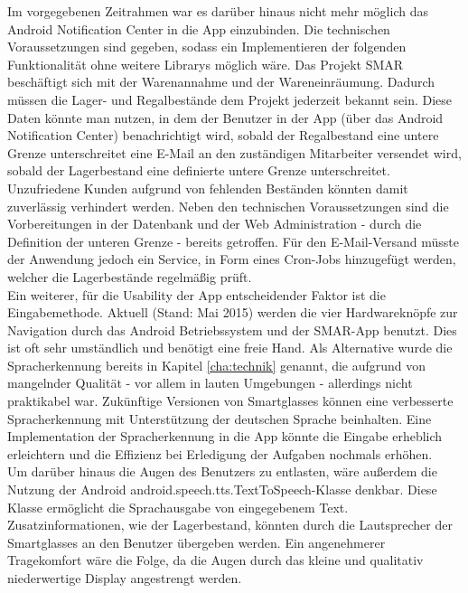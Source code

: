 Im vorgegebenen Zeitrahmen war es darüber hinaus nicht mehr möglich das Android Notification Center in die App einzubinden. Die technischen Voraussetzungen sind gegeben, sodass ein Implementieren der folgenden Funktionalität ohne weitere Librarys möglich wäre. Das Projekt \ac{SMAR} beschäftigt sich mit der Warenannahme und der Wareneinräumung. Dadurch müssen die Lager- und Regalbestände dem Projekt jederzeit bekannt sein. Diese Daten könnte man nutzen, in dem der Benutzer in der App (\zB über das Android Notification Center) benachrichtigt wird, sobald der Regalbestand eine untere Grenze unterschreitet \bzw eine E-Mail an den zuständigen Mitarbeiter versendet wird, sobald der Lagerbestand eine definierte untere Grenze unterschreitet. Unzufriedene Kunden aufgrund von fehlenden Beständen könnten damit zuverlässig verhindert werden. Neben den technischen Voraussetzungen sind die Vorbereitungen in der Datenbank und der Web Administration - durch die Definition der unteren Grenze - bereits getroffen. Für den E-Mail-Versand müsste der Anwendung jedoch ein Service, \zB in Form eines Cron-Jobs hinzugefügt werden, welcher die Lagerbestände regelmäßig prüft.\\

Ein weiterer, für die Usability der App entscheidender Faktor ist die Eingabemethode. Aktuell (Stand: Mai 2015) werden die vier Hardwareknöpfe zur Navigation durch das Android Betriebssystem und der \ac{SMAR}-App benutzt. Dies ist oft sehr umständlich und benötigt eine freie Hand. Als Alternative wurde die Spracherkennung bereits in Kapitel \ref{cha:technik}  genannt, die aufgrund von mangelnder Qualität - vor allem in lauten Umgebungen - allerdings nicht praktikabel war. Zukünftige Versionen von Smartglasses können eine verbesserte Spracherkennung mit Unterstützung der deutschen Sprache beinhalten. Eine Implementation der Spracherkennung in die App könnte die Eingabe erheblich erleichtern und die Effizienz bei Erledigung der Aufgaben nochmals erhöhen.\\
Um darüber hinaus die Augen des Benutzers zu entlasten, wäre außerdem die Nutzung der Android \glqq android.speech.tts.TextToSpeech\grqq -Klasse denkbar. Diese Klasse ermöglicht die Sprachausgabe von eingegebenem Text. Zusatzinformationen, wie \zB der Lagerbestand, könnten durch die Lautsprecher der Smartglasses an den Benutzer übergeben werden. Ein angenehmerer Tragekomfort wäre die Folge, da die Augen durch das kleine und qualitativ niederwertige Display angestrengt werden.\\

